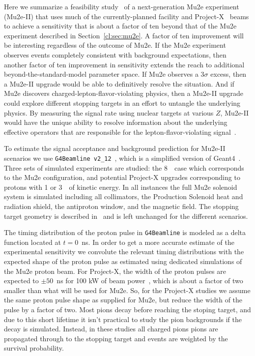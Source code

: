 
%

Here we summarize a feasibility study~\cite{Mu2eII} of a
next-generation Mu2e experiment (Mu2e-II) that uses much of the
currently-planned facility and Project-X~\cite{ProjectX} beams to
achieve a sensitivity that is about a factor of ten beyond that of the
Mu2e experiment described in Section~\ref{cl:sec:mu2e}. A factor of
ten improvement will be interesting regardless of the outcome of Mu2e.
If the Mu2e experiment observes events completely consistent with
background expectations, then another factor of ten improvement in
sensitivity extends the reach to additional beyond-the-standard-model
parameter space.  If Mu2e observes a $3\sigma$ excess, then a Mu2e-II
upgrade would be able to definitively resolve the situation.  And if
Mu2e discovers charged-lepton-flavor-violating physics, then a Mu2e-II
upgrade could explore different stopping targets in an effort to
untangle the underlying physics.  By measuring the signal rate using
nuclear targets at various $Z$, Mu2e-II would have the unique ability
to resolve information about the underlying effective operators that
are responsible for the lepton-flavor-violating
signal~\cite{Kitano:2002mt,Cirigliano:2009bz}.



%
To estimate the signal acceptance and background prediction for
Mu2e-II scenarios we use \texttt{G4Beamline v2\_12}~\cite{g4bl}, which
is a simplified version of Geant4~\cite{GEANT4}.  Three sets of
simulated experiments are studied: the 8~\gev\ case which corresponds
to the Mu2e configuration, and potential Project-X upgrades
corresponding to protons with 1 or 3~\gev\ of kinetic energy.  In all
instances the full Mu2e solenoid system is simulated including all
collimators, the Production Solenoid heat and radiation shield, the
antiproton window, and the magnetic field.  The stopping target
geometry is described in~\cite{Mu2eCDR} and is left unchanged for the
different scenarios.
 

The timing distribution of the proton pulse in \texttt{G4Beamline} is
modeled as a delta function located at $t = 0$~ns.  In order to get a
more accurate estimate of the experimental sensitivity we convolute
the relevant timing distributions with the expected shape of the
proton pulse as estimated using dedicated simulations of the Mu2e
proton beam.  For Project-X, the width of the proton pulses are
expected to $\pm 50$~ns for 100 kW of beam power~\cite{bobT}, which is
about a factor of two smaller than what will be used for Mu2e.  So,
for the Project-X studies we assume the same proton pulse shape as
supplied for Mu2e, but reduce the width of the pulse by a factor of
two.  Most pions decay before reaching the stoping target, and due to
this short lifetime it isn't practical to study the pion backgrounds
if the decay is simulated.  Instead, in these studies all charged
pions pions are propagated through to the stopping target and events
are weighted by the survival probability.
 

